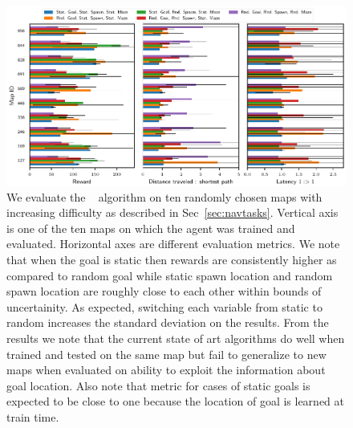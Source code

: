 \begin{figure}%
  \includegraphics[width=\linewidth]{images/plot_summary_bar_plots.pdf}%
  \caption{
    We evaluate the \NavAiiiCDiDiiL{}~\cite{MiPaViICLR2017} algorithm on ten randomly chosen maps with increasing difficulty as described in Sec~\ref{sec:navtasks}.
  Vertical axis is one of the ten maps on which the agent was trained and evaluated.
  Horizontal axes are different evaluation metrics.
  We note that when the goal is static then rewards are consistently higher as compared to random goal while static spawn location and random spawn location are roughly close to each other within bounds of uncertainity. As expected, switching each variable from static to random increases the standard deviation on the results.
  From the \LatencyOneGtOne{} results we note that the current state of art algorithms do well when trained and tested on the same map but fail to generalize to new maps when evaluated on ability to exploit the information about goal location.
  Also note that \LatencyOneGtOne{} metric for cases of static goals is expected to be close to one because the location of goal is learned at train time.
  }%
\label{fig:latency-goal-reward}%
\end{figure}
